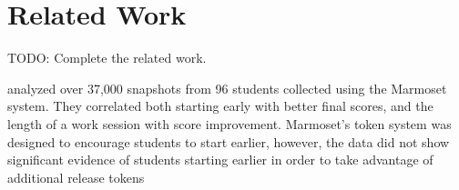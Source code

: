 \section{Related Work}

TODO: Complete the related work.

\spacco{} analyzed over 37,000 snapshots from 96 students collected using the
Marmoset system. They correlated both starting early with better final scores,
and the length of a work session with score improvement. Marmoset's token
system was designed to encourage students to start earlier, however, the data
did not show significant evidence of students starting earlier in order to take
advantage of additional release tokens~\cite{Spacco:2013:TIP:2462476.2465594,
  Spacco:2006:EMD:1140124.1140131}
